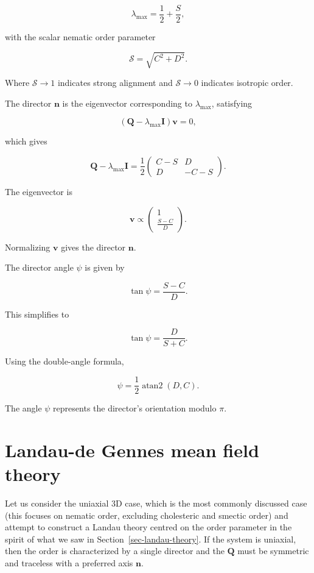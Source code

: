 \documentclass[
  letterpaper,
  enabledeprecatedfontcommands]{report}
\begin{document}
\begin{tcolorbox}
\[
\lambda_{\max} = \frac{1}{2} + \frac{S}{2},
\]

with the scalar nematic order parameter

\[
\mathcal{S} = \sqrt{C^2 + D^2}.
\]

Where \(\mathcal{S} \to 1\) indicates strong alignment and
\(\mathcal{S} \to 0\) indicates isotropic order.

The director \(\mathbf{n}\) is the eigenvector corresponding to
\(\lambda_{\max}\), satisfying

\[
(\mathbf{Q} - \lambda_{\max} \mathbf{I}) \mathbf{v} = 0,
\]

which gives

\[
\mathbf{Q} - \lambda_{\max} \mathbf{I} = \frac{1}{2} \begin{pmatrix}
C - S & D \\
D & -C - S
\end{pmatrix}.
\]

The eigenvector is

\[
\mathbf{v} \propto \begin{pmatrix} 1 \\ \frac{S - C}{D} \end{pmatrix}.
\]

Normalizing \(\mathbf{v}\) gives the director \(\mathbf{n}\).

The director angle \(\psi\) is given by

\[
\tan \psi = \frac{S - C}{D}.
\]

This simplifies to

\[
\tan \psi = \frac{D}{S + C}.
\]

Using the double-angle formula,

\[
\psi = \frac{1}{2} \operatorname{atan2}(D, C).
\]

The angle \(\psi\) represents the director's orientation modulo \(\pi\).

\end{tcolorbox}

\section{Landau-de Gennes mean field
theory}\label{landau-de-gennes-mean-field-theory}

Let us consider the uniaxial 3D case, which is the most commonly
discussed case (this focuses on nematic order, excluding cholesteric and
smectic order) and attempt to construct a Landau theory centred on the
order parameter in the spirit of what we saw in
Section~\ref{sec-landau-theory}. If the system is uniaxial, then the
order is characterized by a single director and the \(\mathbf{Q}\) must
be symmetric and traceless with a preferred axis \(\mathbf{n}\).
\end{document}
